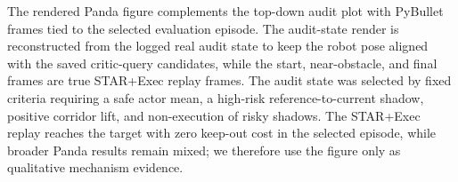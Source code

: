 The rendered Panda figure complements the top-down audit plot with PyBullet frames tied to the selected evaluation episode. The audit-state render is reconstructed from the logged real audit state to keep the robot pose aligned with the saved critic-query candidates, while the start, near-obstacle, and final frames are true STAR+Exec replay frames. The audit state was selected by fixed criteria requiring a safe actor mean, a high-risk reference-to-current shadow, positive corridor lift, and non-execution of risky shadows. The STAR+Exec replay reaches the target with zero keep-out cost in the selected episode, while broader Panda results remain mixed; we therefore use the figure only as qualitative mechanism evidence.
